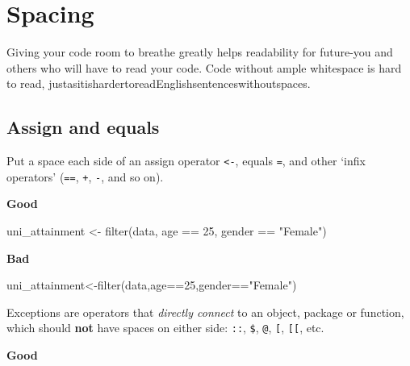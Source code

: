 \documentclass[
]{book}
\newenvironment{Shaded}{\begin{snugshade}}{\end{snugshade}}
\newcommand{\DecValTok}[1]{\textcolor[rgb]{0.00,0.00,0.81}{#1}}
\newcommand{\FunctionTok}[1]{\textcolor[rgb]{0.00,0.00,0.00}{#1}}
\newcommand{\NormalTok}[1]{#1}
\newcommand{\OtherTok}[1]{\textcolor[rgb]{0.56,0.35,0.01}{#1}}
\newcommand{\SpecialCharTok}[1]{\textcolor[rgb]{0.00,0.00,0.00}{#1}}
\newcommand{\StringTok}[1]{\textcolor[rgb]{0.31,0.60,0.02}{#1}}
\begin{document}
\hypertarget{spacing}{%
\section{Spacing}\label{spacing}}

Giving your code room to breathe greatly helps readability for future-you and others who will have to read your code. Code without ample whitespace is hard to read, justasitishardertoreadEnglishsentenceswithoutspaces.

\hypertarget{assign-and-equals}{%
\subsection{Assign and equals}\label{assign-and-equals}}

Put a space each side of an assign operator \texttt{\textless{}-}, equals \texttt{=}, and other `infix operators' (\texttt{==}, \texttt{+}, \texttt{-}, and so on).

\textbf{Good}

\begin{Shaded}
\begin{Highlighting}[]
\NormalTok{uni\_attainment }\OtherTok{\textless{}{-}} \FunctionTok{filter}\NormalTok{(data, age }\SpecialCharTok{==} \DecValTok{25}\NormalTok{, gender }\SpecialCharTok{==} \StringTok{"Female"}\NormalTok{)}
\end{Highlighting}
\end{Shaded}

\textbf{Bad}

\begin{Shaded}
\begin{Highlighting}[]
\NormalTok{uni\_attainment}\OtherTok{\textless{}{-}}\FunctionTok{filter}\NormalTok{(data,age}\SpecialCharTok{==}\DecValTok{25}\NormalTok{,gender}\SpecialCharTok{==}\StringTok{"Female"}\NormalTok{)}
\end{Highlighting}
\end{Shaded}

Exceptions are operators that \emph{directly connect} to an object, package or function, which should \textbf{not} have spaces on either side: \texttt{::}, \texttt{\$}, \texttt{@}, \texttt{{[}}, \texttt{{[}{[}}, etc.

\textbf{Good}

\begin{Shaded}
\end{Shaded}
\end{document}
